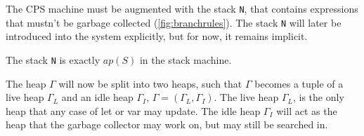 The CPS machine must be augmented with the stack \texttt{N}, that contains expressions that mustn't be garbage collected (\autoref{fig:branchrules}).
The stack \texttt{N} will later be introduced into the system explicitly, but for now, it remains implicit.
\begin{remark}
	The stack \texttt{N} is exactly $\textit{ap}(S)$ in the stack machine.
\end{remark}

The heap $\Gamma$ will now be split into two heaps, such that $\Gamma$ becomes a tuple of a live heap $\Gamma_L$ and an idle heap $\Gamma_I$, $\Gamma = (\Gamma_L, \Gamma_I)$.
The live heap $\Gamma_L$, is the only heap that any case of let or var may update.
The idle heap $\Gamma_I$ will act as the heap that the garbage collector may work on, but may still be searched in.

